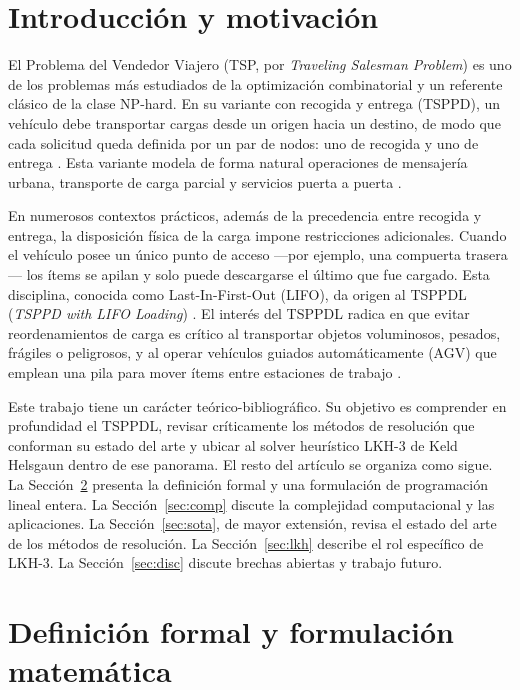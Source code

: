 \documentclass[conference]{IEEEtran}
\begin{document}
\section{Introducción y motivación}
El Problema del Vendedor Viajero (TSP, por \textit{Traveling Salesman Problem}) es uno de los problemas más estudiados de la optimización combinatorial y un referente clásico de la clase NP-hard. En su variante con recogida y entrega (TSPPD), un vehículo debe transportar cargas desde un origen hacia un destino, de modo que cada solicitud queda definida por un par de nodos: uno de recogida y uno de entrega \cite{cordeau2010,li2011}. Esta variante modela de forma natural operaciones de mensajería urbana, transporte de carga parcial y servicios puerta a puerta \cite{cordeau2010}.

En numerosos contextos prácticos, además de la precedencia entre recogida y entrega, la disposición física de la carga impone restricciones adicionales. Cuando el vehículo posee un único punto de acceso —por ejemplo, una compuerta trasera— los ítems se apilan y solo puede descargarse el último que fue cargado. Esta disciplina, conocida como Last-In-First-Out (LIFO), da origen al TSPPDL (\textit{TSPPD with LIFO Loading}) \cite{cordeau2010,tu2010}. El interés del TSPPDL radica en que evitar reordenamientos de carga es crítico al transportar objetos voluminosos, pesados, frágiles o peligrosos, y al operar vehículos guiados automáticamente (AGV) que emplean una pila para mover ítems entre estaciones de trabajo \cite{levitin2003,cordeau2010}.

Este trabajo tiene un carácter teórico-bibliográfico. Su objetivo es comprender en profundidad el TSPPDL, revisar críticamente los métodos de resolución que conforman su estado del arte y ubicar al solver heurístico LKH-3 de Keld Helsgaun \cite{helsgaun2017} dentro de ese panorama. El resto del artículo se organiza como sigue. La Sección~\ref{sec:def} presenta la definición formal y una formulación de programación lineal entera. La Sección~\ref{sec:comp} discute la complejidad computacional y las aplicaciones. La Sección~\ref{sec:sota}, de mayor extensión, revisa el estado del arte de los métodos de resolución. La Sección~\ref{sec:lkh} describe el rol específico de LKH-3. La Sección~\ref{sec:disc} discute brechas abiertas y trabajo futuro.

\section{Definición formal y formulación matemática}\label{sec:def}
\end{document}
